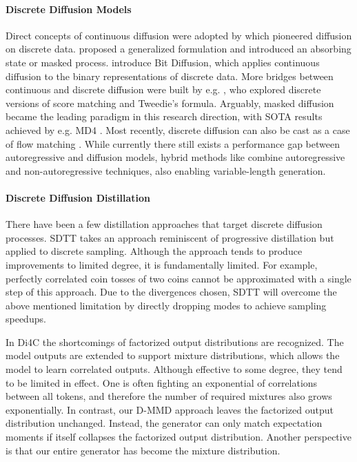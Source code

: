 \paragraph{Discrete Diffusion Models}
Direct concepts of continuous diffusion were adopted by \citep{sohldickstein2015diffusion,hoogeboom2021argmaxflows,austin2021structured} which pioneered diffusion on discrete data.
\citet{austin2021structured} proposed a generalized formulation and introduced an absorbing state or masked process.
\citet{chen2022analog} introduce Bit Diffusion, which applies continuous diffusion to the binary representations of discrete data.
More bridges between continuous and discrete diffusion were built by e.g. \citet{lou2023discrete}, who explored discrete versions of score matching and Tweedie's formula.
Arguably, masked diffusion became the leading paradigm in this research direction, with SOTA results achieved by e.g. MD4 \citet{shi2024simplified}.
Most recently, discrete diffusion can also be cast as a case of flow matching \cite{gat2024discreteflowmatching}.
While currently there still exists a performance gap between autoregressive and diffusion models, hybrid methods like
\citet{arriola2025block} combine autoregressive and non-autoregressive techniques, also enabling variable-length generation.

\paragraph{Discrete Diffusion Distillation}
There have been a few distillation approaches that target discrete diffusion processes. SDTT \citep{deschenaux2025beyondautoregression} takes an approach reminiscent of progressive distillation but applied to discrete sampling. Although the approach tends to produce improvements to limited degree, it is fundamentally limited. For example, perfectly correlated coin tosses of two coins cannot be approximated with a single step of this approach. Due to the divergences chosen, SDTT will overcome the above mentioned limitation by directly dropping modes to achieve sampling speedups.

In Di4C \citep{hayakawa2024distillationdiscretediffusion} the shortcomings of factorized output distributions are recognized. The model outputs are extended to support mixture distributions, which allows the model to learn correlated outputs. Although effective to some degree, they tend to be limited in effect. One is often fighting an exponential of correlations between all tokens, and therefore the number of required mixtures also grows exponentially. In contrast, our D-MMD approach leaves the factorized output distribution unchanged. Instead, the generator can only match expectation moments if itself collapses the factorized output distribution. Another perspective is that our entire generator has become the mixture distribution.

